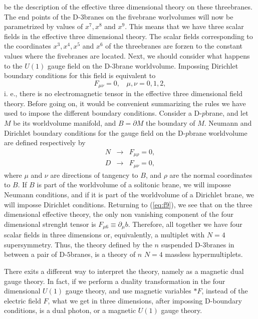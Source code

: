 be the description of the effective three dimensional theory on
these threebranes. The end points of the D-$3$branes on the
fivebrane worlvolumes will now be parametrized by values of
$x^7,x^8$ and $x^9$. This means that we have three scalar fields
in the effective three dimensional theory. The scalar fields
corresponding to the coordinates $x^3,x^4,x^5$ and $x^6$ of the
threebranes are forzen to the constant values where the
fivebranes are located. Next, we should consider what happens to
the $U(1)$ gauge field on the D-$3$brane worldvolume. Impossing
Dirichlet boundary conditions for this field is equivalent to 
\begin{equation}
F_{\mu \nu} =0, \: \: \: \: \mu, \nu=0,1,2,
\label{eq:f9}
\end{equation}
i. e., there is no electromagnetic tensor in the effective three dimensional field
theory. Before going on, it would be convenient summarizing the
rules we have used to impose the different boundary conditions.
Consider a D-$p$brane, and let $M$ be its worldvolume manifold,
and $B=\partial M$ the boundary of $M$. Neumann and Dirichlet
boundary conditions for the gauge field on the D-$p$brane
worldvolume are defined respectively by
\begin{eqnarray}
N & \longrightarrow & F_{\mu \rho} =0, \nonumber \\
D & \longrightarrow & F_{\mu \nu} =0,
\label{eq:f10}
\end{eqnarray}
where $\mu$ and $\nu$ are directions of tangency to $B$, and
$\rho$ are the normal coordinates to $B$. If $B$ is part of the
worldvolume of a solitonic brane, we will imposse Neumann
conditions, and if it is part of the worldvolume of a Dirichlet
brane, we will imposse Dirichlet conditions. Returning to
(\ref{eq:f9}), we see that on the three dimensional effective
theory, the only non vanishing component of the four dimensional
strenght tensor is $F_{\mu 6} \equiv \partial_{\mu}b$. Therefore,
all together we have four scalar fields in three dimensions or,
equivalently, a multiplet with $N=4$ supersymmetry. Thus, the
theory defined by the $n$ suspended D-$3$branes in between a pair
of D-$5$branes, is a theory of $n$ $N=4$ massless
hypermultiplets.
  
There exits a different way to interpret the theory, namely as a
magnetic dual gauge theory. In fact, if we perform a duality
transformation in the four dimensional $U(1)$ gauge theory, and
use magnetic variables $*F$, instead of the electric field $F$,
what we get in three dimensions, after impossing D-boundary
conditions, is a dual photon, or a magnetic $U(1)$ gauge theory.
  
